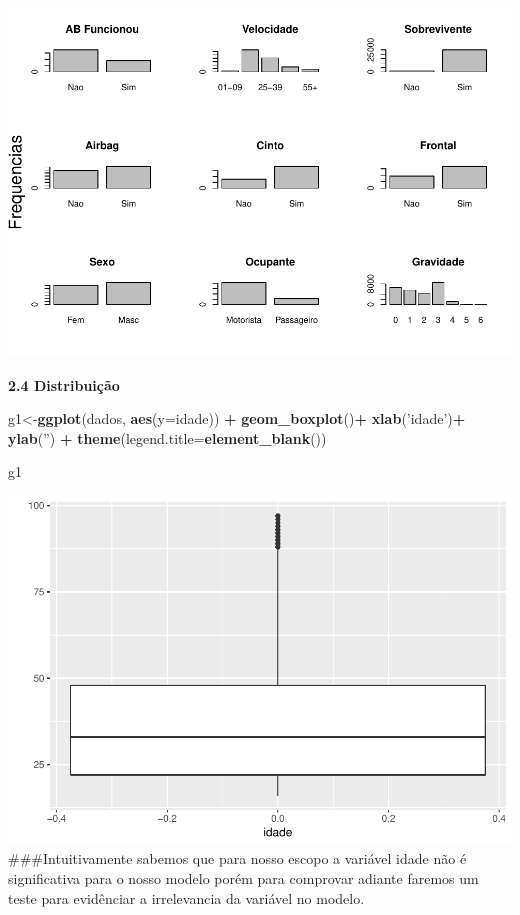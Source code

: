 \documentclass[]{article}
\newenvironment{Shaded}{\begin{snugshade}}{\end{snugshade}}
\newcommand{\KeywordTok}[1]{\textcolor[rgb]{0.13,0.29,0.53}{\textbf{#1}}}
\newcommand{\DataTypeTok}[1]{\textcolor[rgb]{0.13,0.29,0.53}{#1}}
\newcommand{\StringTok}[1]{\textcolor[rgb]{0.31,0.60,0.02}{#1}}
\newcommand{\OperatorTok}[1]{\textcolor[rgb]{0.81,0.36,0.00}{\textbf{#1}}}
\newcommand{\NormalTok}[1]{#1}
\begin{document}
\includegraphics{Dados_Binários1_files/figure-latex/unnamed-chunk-5-1.pdf}

\textbf{2.4 Distribuição}

\begin{Shaded}
\begin{Highlighting}[]
\NormalTok{g1<-}\KeywordTok{ggplot}\NormalTok{(dados, }\KeywordTok{aes}\NormalTok{(}\DataTypeTok{y=}\NormalTok{idade)) }\OperatorTok{+}\StringTok{ }
\StringTok{  }\KeywordTok{geom_boxplot}\NormalTok{()}\OperatorTok{+}\StringTok{ }\KeywordTok{xlab}\NormalTok{(}\StringTok{'idade'}\NormalTok{)}\OperatorTok{+}\StringTok{ }\KeywordTok{ylab}\NormalTok{(}\StringTok{''}\NormalTok{) }\OperatorTok{+}
\StringTok{  }\KeywordTok{theme}\NormalTok{(}\DataTypeTok{legend.title=}\KeywordTok{element_blank}\NormalTok{())}


\NormalTok{g1}
\end{Highlighting}
\end{Shaded}

\includegraphics{Dados_Binários1_files/figure-latex/unnamed-chunk-6-1.pdf}
\#\#\#Intuitivamente sabemos que para nosso escopo a variável idade não
é significativa para o nosso modelo porém para comprovar adiante faremos
um teste para evidênciar a irrelevancia da variável no modelo.
\end{document}
